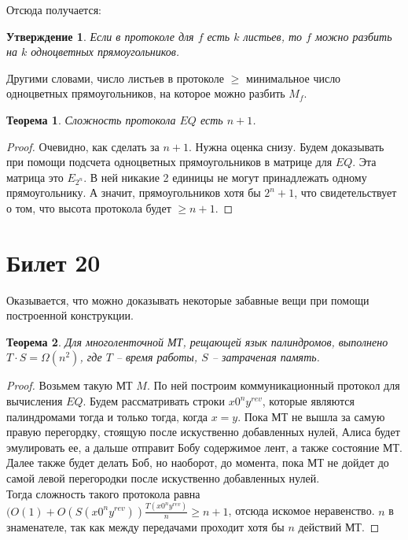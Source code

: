 \documentclass[12pt, letterpaper]{article}
\newtheorem{theorem}{Теорема}[section]
\newtheorem{prop}{Утверждение}[section]
\begin{document}
Отсюда получается: 
\begin{prop}
Если в протоколе для $f$ есть $k$ листьев, то $f$ можно разбить на $k$ одноцветных прямоугольников.
\end{prop}
Другими словами, число листьев в протоколе $\geq$ минимальное число одноцветных прямоугольников, на которое можно разбить $M_f$. 	
\begin{theorem}
Сложность протокола $EQ$ есть $n+1$.
\end{theorem}
\begin{proof}
Очевидно, как сделать за $n+1$. Нужна оценка снизу. Будем доказывать при помощи подсчета одноцветных прямоугольников в матрице для $EQ$. Эта матрица это $E_{2^n}$. В ней никакие 2 единицы не могут принадлежать одному прямоугольнику. А значит, прямоугольников хотя бы $2^n+1$, что свидетельствует о том, что высота протокола будет $\geq n+1$. 
\end{proof}

\section{Билет 20}
Оказывается, что можно доказывать некоторые забавные вещи при помощи построенной конструкции.
\begin{theorem}
Для многоленточной МТ, рещающей язык палиндромов, выполнено $T \cdot S = \Omega(n^2)$, где $T$ -- время работы, $S$ -- затраченая память.
\end{theorem}
\begin{proof}
Возьмем такую МТ $M$. По ней построим коммуникационный протокол для вычисления $EQ$. Будем рассматривать строки $x0^ny^{rev}$, которые являются палиндромами тогда и только тогда, когда $x=y$. Пока МТ не вышла за самую правую перегордку, стоящую после искуственно добавленных нулей, Алиса будет эмулировать ее, а дальше отправит Бобу содержимое лент, а также состояние МТ. Далее также будет делать Боб, но наоборот, до момента, пока МТ не дойдет до самой левой перегородки после искуственно добавленных нулей. \\
Тогда сложность такого протокола равна $(O(1) + O(S(x0^ny^{rev})) \frac{T(x0^ny^{rev})}{n} \geq n + 1$, отсюда искомое неравенство. $n$ в знаменателе, так как между передачами проходит хотя бы $n$ действий МТ.
\end{proof}
\end{document}
